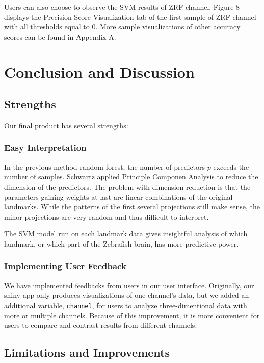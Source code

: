 \documentclass[10pt,letterpaper]{article}
\begin{document}
Users can also choose to observe the SVM results of ZRF channel. Figure
8 displays the Precision Score Visualization tab of the first sample of
ZRF channel with all thresholds equal to 0. More sample visualizations
of other accuracy scores can be found in Appendix A.

\section{Conclusion and Discussion}\label{conclusion-and-discussion}

\subsection{Strengths}\label{strengths}

Our final product has several strengths:

\subsubsection{Easy Interpretation}\label{easy-interpretation}

In the previous method random forest, the number of predictors \(p\)
exceeds the number of samples. Schwartz applied Principle Componen
Analysis to reduce the dimension of the predictors. The problem with
dimension reduction is that the parameters gaining weights at last are
linear combinations of the original landmarks. While the patterns of the
first several projections still make sense, the minor projections are
very random and thus difficult to interpret.

The SVM model run on each landmark data gives insightful analysis of
which landmark, or which part of the Zebrafish brain, has more
predictive power.

\subsubsection{Implementing User
Feedback}\label{implementing-user-feedback}

We have implemented feedbacks from users in our user interface.
Originally, our shiny app only produces visualizations of one channel's
data, but we added an additional variable, \texttt{channel}, for users
to analyze three-dimentional data with more or multiple channels.
Because of this improvement, it is more convenient for users to compare
and contrast results from different channels.

\subsection{Limitations and
Improvements}\label{limitations-and-improvements}
\end{document}
